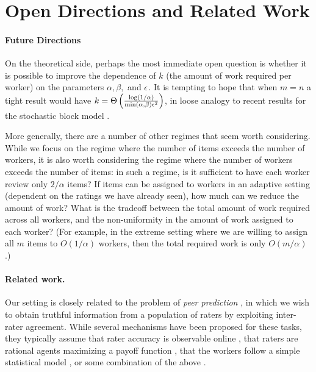 \section{Open Directions and Related Work}
\label{sec:discussion}
\iffalse
\todo{fill in with lower bounds and conjectures that explain what 
``best possible'' result would look like, and how adversarial and 
stochastic settings compare}\fi

\paragraph{Future Directions}
On the theoretical side, perhaps the most immediate open question is whether it is 
possible to improve the dependence of $k$ (the amount of work required per worker) 
on the parameters $\alpha, \beta,$ and $\epsilon$.  It is tempting to hope that 
when $m = n$ a tight result would have 
$k = \Theta\left( \frac{\log(1/\alpha)}{\min (\alpha,\beta)\epsilon^2} \right)$, in loose analogy
to recent results for the stochastic block model \citep{banks2016information}.


More generally, there are a number of other regimes that seem worth considering.  
While we focus on the regime where the number of items exceeds the number of 
workers, it is also worth considering the regime where the number of workers 
exceeds the number of items:  in such a regime, is it sufficient to have each 
worker review only $2/\alpha$ items?  If items can be assigned to workers in an 
adaptive setting (dependent on the ratings we have already seen), how much can 
we reduce the amount of work?  What is the tradeoff between the total amount of 
work required across all workers, and the non-uniformity in the amount of work 
assigned to each worker?  (For example, in the extreme setting where we  are 
willing to assign all $m$ items to $O(1/\alpha)$ workers, then the total 
required work is only $O(m/\alpha)$.)



\paragraph{Related work.}
Our setting is closely related to the problem of \emph{peer prediction} 
\citep{miller2005eliciting}, in which we wish to obtain truthful information 
from a population of raters by exploiting inter-rater agreement. 
While several mechanisms have been proposed for these tasks, 
they typically assume that rater accuracy is observable online
\citep{resnick2007influence}, that raters are 
rational agents maximizing a payoff function \citep{dasgupta2013crowdsourced,
kamble2015truth,shnayder2016strong}, that the workers follow a simple 
statistical model \citep{karger2014budget,zhang2014crowdsourcing,
zhou2015regularized}, or some combination of the above \citep{shah2015double,
shah2015approval}. 

